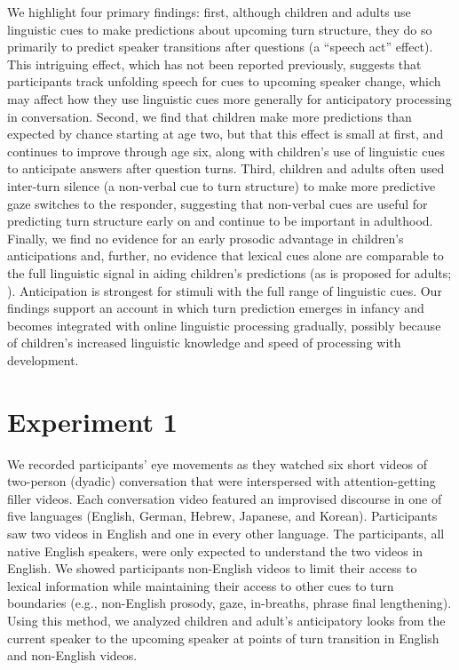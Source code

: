 \documentclass[authoryear, 12pt]{elsarticle}
\begin{document}
We highlight four primary findings: first, although children and adults use linguistic cues to make predictions about upcoming turn structure, they do so primarily to predict speaker transitions after questions (a ``speech act'' effect). This intriguing effect, which has not been reported previously, suggests that participants track unfolding speech for cues to upcoming speaker change, which may affect how they use linguistic cues more generally for anticipatory processing in conversation. Second, we find that children make more predictions than expected by chance starting at age two, but that this effect is small at first, and continues to improve through age six, along with children's use of linguistic cues to anticipate answers after question turns. Third, children and adults often used inter-turn silence (a non-verbal cue to turn structure) to make more predictive gaze switches to the responder, suggesting that non-verbal cues are useful for predicting turn structure early on and continue to be important in adulthood. Finally, we find no evidence for an early prosodic advantage in children's anticipations and, further, no evidence that lexical cues alone are comparable to the full linguistic signal in aiding children's predictions (as is proposed for adults; \citealp{de-ruiter2006}). Anticipation is strongest for stimuli with the full range of linguistic cues. Our findings support an account in which turn prediction emerges in infancy and becomes integrated with online linguistic processing gradually, possibly because of children's increased linguistic knowledge and speed of processing with development.

\section*{Experiment 1}
\label{sec:exp1}

We recorded participants' eye movements as they watched six short videos of two-person (dyadic) conversation that were interspersed with attention-getting filler videos. Each conversation video featured an improvised discourse in one of five languages (English, German, Hebrew, Japanese, and Korean). Participants saw two videos in English and one in every other language. The participants, all native English speakers, were only expected to understand the two videos in English. We showed participants non-English videos to limit their access to lexical information while maintaining their access to other cues to turn boundaries (e.g., non-English prosody, gaze, in-breaths, phrase final lengthening). Using this method, we analyzed children and adult's anticipatory looks from the current speaker to the upcoming speaker at points of turn transition in English and non-English videos.
\end{document}
